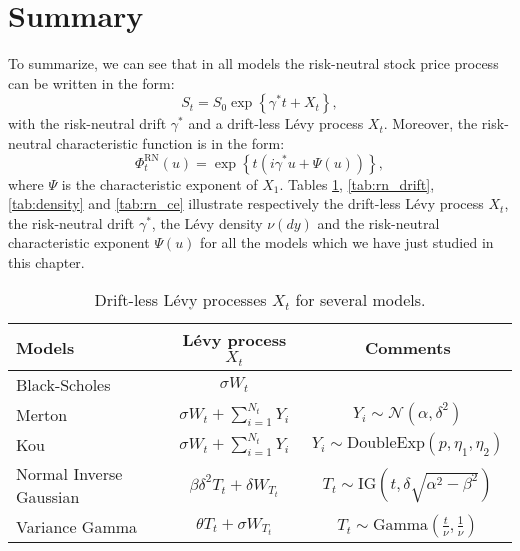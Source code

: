 \section{Summary}
To summarize, we can see that in all models the risk-neutral stock price process can be written in the form:
$$S_t = S_0\exp\left\{\gamma^\ast t + X_t\right\},$$
with the risk-neutral drift $\gamma^\ast$ and a drift-less L\'evy process $X_t$. Moreover, the risk-neutral characteristic function is in the form:
$$\Phi^\text{RN}_t(u) = \exp\left\{t\left(i\gamma^\ast u + \Psi(u)\right)\right\},$$
where $\Psi$ is the characteristic exponent of $X_1$. Tables \ref{tab:LevyPro}, \ref{tab:rn_drift}, \ref{tab:density} and \ref{tab:rn_ce} illustrate respectively the drift-less L\'evy process $X_t$, the risk-neutral drift $\gamma^\ast$, the L\'evy density $\nu(dy)$ and the risk-neutral characteristic exponent $\Psi(u)$ for all the models which we have just studied in this chapter.
\vspace{3cm}
\begin{table}[!ht]
\centering
  \begin{tabular}{l|c|c}
    \toprule
    Models & L\'evy process $X_t$ & Comments\\
    \toprule
   Black-Scholes & $\sigma W_t$ & \\
   \midrule
   Merton & $\sigma W_t +\sum_{i=1}^{N_t}Y_i$ & $Y_i\sim\mathcal{N}(\alpha,\delta^2)$\\
   Kou & $\sigma W_t +\sum_{i=1}^{N_t}Y_i$ & $Y_i\sim\text{DoubleExp}(p,\eta_1,\eta_2)$\\
   \midrule
   Normal Inverse Gaussian & $\beta\delta^2 T_t +\delta W_{T_t}$ & $T_t\sim \text{IG}\left(t,\delta \sqrt{\alpha^2-\beta^2}\right)$ \\
   Variance Gamma & $\theta T_t +\sigma W_{T_t}$ & $T_t\sim \text{Gamma}\left(\frac{t}{\nu},\frac{1}{\nu}\right)$\\ 
    \bottomrule
  \end{tabular}
  \vspace{5pt}
  \caption{\label{tab:LevyPro} Drift-less L\'evy processes $X_t$ for several models.}
\end{table}

